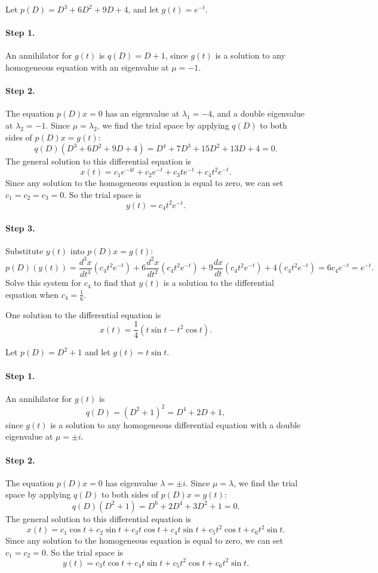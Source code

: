 \documentclass{ximera}
\begin{document}
\soln Let $p(D) = D^3 + 6D^2 + 9D + 4$, and let $g(t) = e^{-t}$.
\paragraph{Step 1.} An annihilator for $g(t)$ is $q(D) = D + 1$, since
$g(t)$ is a solution to any homogeneous equation with an eigenvalue at
$\mu = -1$.

\paragraph{Step 2.} The equation $p(D)x = 0$ has an eigenvalue at
$\lambda_1 = -4$, and a double eigenvalue at $\lambda_2 = -1$.  Since
$\mu = \lambda_2$, we find the trial space by applying $q(D)$ to both
sides of $p(D)x = g(t)$:
\[
q(D)(D^3 + 6D^2 + 9D + 4) = D^4 + 7D^3 + 15D^2 + 13D + 4 = 0.
\]
The general solution to this differential equation is
\[
x(t) = c_1e^{-4t} + c_2e^{-t} + c_3te^{-t} + c_4t^2e^{-t}.
\]
Since any solution to the homogeneous equation is equal to zero, we can set
$c_1 = c_2 = c_3 = 0$.  So the trial space is
\[
y(t) = c_4t^2e^{-t}.
\]
\paragraph{Step 3.} Substitute $y(t)$ into $p(D)x = g(t)$:
\[
p(D)(y(t)) = \frac{d^3x}{dt^3}(c_4t^2e^{-t}) +
6\frac{d^2x}{dt^2}(c_4t^2e^{-t}) + 9\frac{dx}{dt}(c_4t^2e^{-t}) +
4(c_4t^2e^{-t}) = 6c_4e^{-t} =  e^{-t}.
\]
Solve this system for $c_4$ to find that $y(t)$ is a solution to the
differential equation when $c_4 = \frac{1}{6}$.

 \ans One solution to the differential equation is
\[
x(t) = \frac{1}{4}(t\sin t- t^2\cos t).
\]

\soln Let $p(D) = D^2 + 1$ and let $g(t) = t\sin t$.
\paragraph{Step 1.} An annihilator for $g(t)$ is
\[
q(D) = (D^2 + 1)^2 = D^4 + 2D + 1,
\]
since $g(t)$ is a solution to any homogeneous differential equation
with a double eigenvalue at $\mu = \pm i$.

\paragraph{Step 2.} The equation $p(D)x = 0$ has eigenvalue $\lambda =
\pm i$.  Since $\mu = \lambda$, we find the trial space by applying
$q(D)$ to both sides of $p(D)x = g(t)$:
\[
q(D)(D^2 + 1) = D^6 + 2D^4 + 3D^2 + 1 = 0.
\]
The general solution to this differential equation is
\[
x(t) = c_1\cos t + c_2\sin t + c_3t\cos t + c_4t\sin t + c_5t^2\cos t
+ c_6t^2\sin t.
\]
Since any solution to the homogeneous equation is equal to zero, we can
set $c_1 = c_2 = 0$.  So the trial space is
\[
y(t) = c_3t\cos t + c_4t\sin t + c_5t^2\cos t + c_6t^2\sin t.
\]
\end{document}
